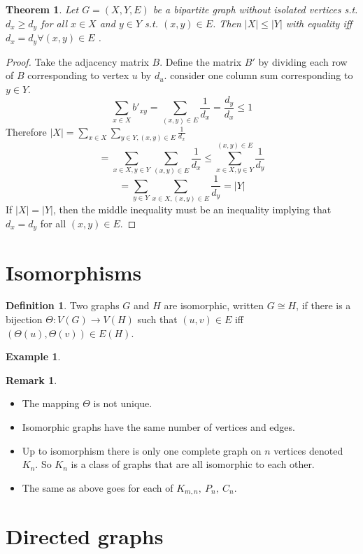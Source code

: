 \documentclass{article}
\newtheorem*{thm}{Theorem}
\theoremstyle{definition}
\newtheorem*{defn}{Definition}
\newtheorem*{ex}{Example}
\newtheorem*{rem}{Remark}
\begin{document}
\begin{thm}
Let $G=(X,Y,E)$ be a bipartite graph without isolated vertices s.t. $d_x\geq d_y$ for all $x\in X$ and $y\in Y$ s.t. $(x,y)\in E$.
Then $|X| \leq |Y|$ with equality iff $d_x = d_y \forall (x,y)\in E$ .
\end{thm}
\begin{proof}
Take the adjacency matrix $B$.
Define the matrix $B'$ by dividing each row of $B$ corresponding to vertex $u$ by $d_u$.
consider one column sum corresponding to $y\in Y$.
$$\sum_{x\in X} b'_{xy} = \sum_{(x,y)\in E} \frac{1}{d_x} = \frac{d_y}{d_x} \leq 1$$
Therefore $|X|=\sum_{x\in X}\sum_{y\in Y,(x,y)\in E} \frac{1}{d_x}$
$$=\sum_{x\in X, y\in Y}\sum_{(x,y)\in E} \frac{1}{d_x} \leq \sum_{x\in X, y\in Y}^{(x,y)\in E} \frac{1}{d_y}$$
$$=\sum_{y\in Y} \sum_{x\in X,(x,y)\in E} \frac{1}{d_y} = |Y|$$
If $|X|=|Y|$, then the middle inequality must be an inequality implying that $d_x=d_y$ for all $(x,y)\in E$.
\end{proof}

\section{Isomorphisms}

\begin{defn}
Two graphs $G$ and $H$ are isomorphic, written $G\cong H$, if there is a bijection $\Theta\colon V(G) \to V(H)$ such that $(u,v)\in E$ iff $(\Theta(u),\Theta(v))\in E(H)$.
\end{defn}

\begin{ex}
\end{ex}

\begin{rem}
\begin{itemize}
\item The mapping $\Theta$ is not unique.
\item Isomorphic graphs have the same number of vertices and edges.
\item Up to isomorphism there is only one complete graph on $n$ vertices denoted $K_n$.
So $K_n$ is a class of graphs that are all isomorphic to each other.
\item The same as above goes for each of $K_{m,n},\ P_n,\ C_n$.
\end{itemize}
\end{rem}

\section{Directed graphs}
\end{document}
